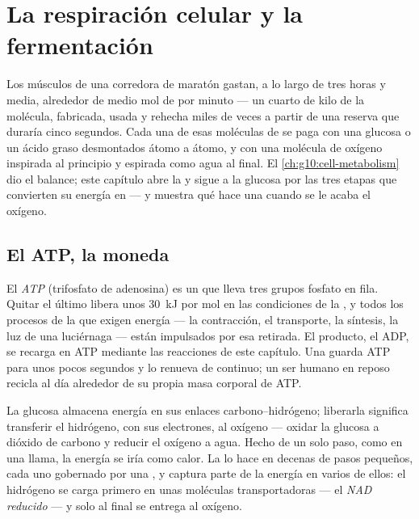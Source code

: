 \chapter{La respiración celular y la fermentación}\label{ch:g12:respiration-fermentation}

Los músculos de una corredora de maratón gastan, a lo largo de tres
horas y media, alrededor de medio mol de  por minuto --- un cuarto
de kilo de la molécula, fabricada, usada y rehecha miles de veces a
partir de una reserva que duraría cinco segundos. Cada una de esas
moléculas de  se paga con una glucosa o un ácido graso desmontados
átomo a átomo, y con una molécula de oxígeno inspirada al principio y
espirada como agua al final. El \cref{ch:g10:cell-metabolism} dio el
balance; este capítulo abre la  y sigue a la glucosa por las
tres etapas que convierten su energía en  --- y muestra qué hace una
 cuando se le acaba el oxígeno.

\section{El ATP, la moneda}

\begin{definition}[ATP]\label{def:g12:respiration-fermentation:atp}
El \emph{ATP} (trifosfato de adenosina) es un  que
lleva tres grupos fosfato en fila. Quitar el último libera unos
\qty{30}{kJ} por mol en las condiciones de la , y todos los
procesos de la  que exigen energía --- la contracción, el
transporte, la síntesis, la luz de una luciérnaga --- están impulsados
por esa retirada. El producto, el ADP, se recarga en ATP mediante las
reacciones de este capítulo. Una  guarda ATP para unos pocos
segundos y lo renueva de continuo; un ser humano en reposo recicla al
día alrededor de su propia masa corporal de ATP.
\end{definition}

\begin{proposition}\label{prop:g12:respiration-fermentation:oxidation}
La glucosa almacena energía en sus enlaces carbono--hidrógeno;
liberarla significa transferir el hidrógeno, con sus electrones, al
oxígeno --- oxidar la glucosa a dióxido de carbono y reducir el oxígeno
a agua. Hecho de un solo paso, como en una llama, la energía se iría
como calor. La  lo hace en decenas de pasos pequeños, cada uno
gobernado por una , y captura parte de la energía en varios de
ellos: el hidrógeno se carga primero en unas moléculas transportadoras
--- el \emph{NAD reducido} --- y solo al final se entrega al oxígeno.
\end{proposition}
\admitted

